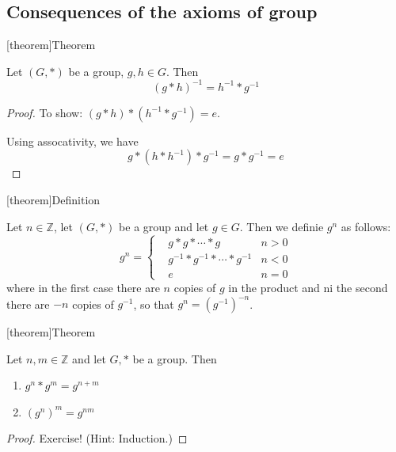 \documentclass[12pt]{report}
\theoremstyle{definition}
\begin{document}
\subsection{Consequences of the axioms of group}

[theorem]{Theorem}
\begin{inverse binary opereation}
    Let $(G,*)$ be a group, $g, h \in G$. Then \[
        {(g*h)}^{-1} = h^{-1} * g^{-1}
    \]
\end{inverse binary opereation}
\begin{proof}
    To show: $(g*h) * (h^{-1} * g^{-1}) = e$.

    Using assocativity, we have \[
        g*(h*h^{-1})*g^{-1} = g*g^{-1} = e
    \]
\end{proof}

[theorem]{Definition}
\begin{g to the power of n}
    Let $n \in \mathbb{Z}$, let $(G,*)$ be a group and let $g \in G$. Then we definie $g^{n}$ as follows:\[
        g^{n} = \left\{
            \begin{align*}
                & g * g * \cdots * g & n > 0 \\
                & g^{-1} * g^{-1} * \cdots * g^{-1} & n < 0 \\
                & e & n = 0
            \end{align*}
            \right.
    \]
    where in the first case there are $n$ copies of $g$ in the product and ni the second there are $-n$
    copies of $g^{-1}$, so that $g^{n} = {(g^{-1})}^{-n}$.
\end{g to the power of n}

[theorem]{Theorem}
\begin{properties of g tp n}
    Let $n, m \in \mathbb{Z}$ and let $G, *$ be a group. Then
    \begin{enumerate}
        \item $g^{n} * g^{m} = g^{n + m}$
        \item ${(g^{n})}^{m} = g^{nm}$
    \end{enumerate}
    
\end{properties of g tp n}

\begin{proof}
    Exercise! (Hint: Induction.)
\end{proof}
\end{document}
